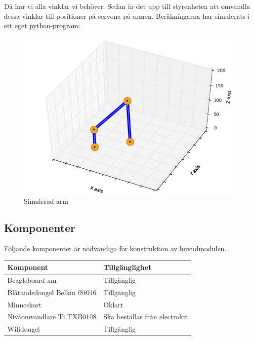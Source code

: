 Då har vi alla vinklar vi behöver. Sedan är det upp till styrenheten att omvandla dessa vinklar till positioner på servona på armen.
Beräkningarna har simulerats i ett eget python-program:
\begin{figure}[h]
\includegraphics[scale=0.6]{simulator}
\caption{Simulerad arm}
\end{figure}
\subsection{Komponenter}
Följande komponenter är nödvändiga för konstruktion av huvudmodulen.\\
\begin{tabularx}{\textwidth}{| l | X |}
	\hline
	{\textbf{Komponent}} & {\textbf{Tillgänglighet}} \\\hline
	{Beagleboard-xm} & {Tillgänglig} \\\hline
	{Blåtandsdongel Belkin f8t016} & {Tillgänglig} \\\hline
	{Minneskort} & {Oklart} \\\hline
	{Nivåomvandlare Ti TXB0108} & {Ska beställas från electrokit\cite{nivaomvandlare}} \\\hline
	{Wifidongel} & {Tillgänglig} \\\hline
\end{tabularx}
